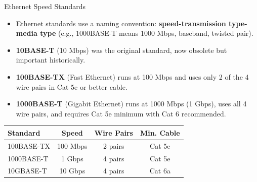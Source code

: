 \documentclass[aspectratio=169]{beamer}
\begin{document}
\begin{frame}{Ethernet Speed Standards}
    \begin{itemize}
        \item Ethernet standards use a naming convention: \textbf{speed-transmission type-media type} (e.g., 1000BASE-T means 1000 Mbps, baseband, twisted pair).
        \item \textbf{10BASE-T} (10 Mbps) was the original standard, now obsolete but important historically.
        \item \textbf{100BASE-TX} (Fast Ethernet) runs at 100 Mbps and uses only 2 of the 4 wire pairs in Cat 5e or better cable.
        \item \textbf{1000BASE-T} (Gigabit Ethernet) runs at 1000 Mbps (1 Gbps), uses all 4 wire pairs, and requires Cat 5e minimum with Cat 6 recommended.
    \end{itemize}
    
    \vspace{0.3cm}
    \begin{table}
        \centering
        \small
        \begin{tabular}{|l|c|c|c|}
            \hline
            \rowcolor{networkgreen!20}
            \textbf{Standard} & \textbf{Speed} & \textbf{Wire Pairs} & \textbf{Min. Cable} \\
            \hline
            100BASE-TX & 100 Mbps & 2 pairs & Cat 5e \\
            \hline
            1000BASE-T & 1 Gbps & 4 pairs & Cat 5e \\
            \hline
            10GBASE-T & 10 Gbps & 4 pairs & Cat 6a \\
            \hline
        \end{tabular}
    \end{table}
\end{frame}
\end{document}
